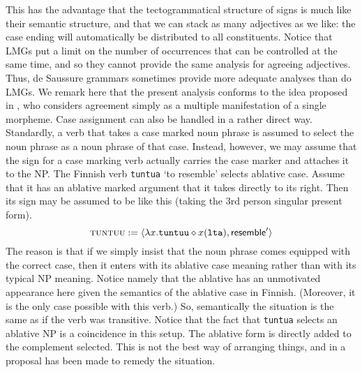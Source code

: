 This has the advantage that the tectogrammatical structure of signs 
is much like their semantic structure, and that we can stack as many 
adjectives as we like: the case ending will automatically be distributed 
to all constituents. Notice that LMGs put a limit on the number of 
occurrences that can be controlled at the same time, and so they 
cannot provide the same analysis for agreeing adjectives. Thus, 
de Saussure grammars sometimes provide more adequate analyses than 
do LMGs. We remark here that the present analysis conforms to the idea 
proposed in \cite{harris:structural}, 
who considers agreement simply
as a multiple manifestation of a single morpheme. Case assignment
can also be handled in a rather direct way. Standardly, a verb that
takes a case marked noun phrase is assumed to select the noun phrase
as a noun phrase of that case. Instead, however, we may assume that
the sign for a case marking verb actually carries the case marker
and attaches it to the NP. The Finnish verb {\tt tuntua} `to
resemble' selects ablative case. Assume that it has an
ablative marked argument that it takes directly to its right.
Then its sign may be assumed to be like this (taking the 3rd person
singular present form).
\begin{equation}
\mbox{\sc tuntuu} :=
    \langle \lambda x.\mbox{\tt tuntuu}\diamond x(\mbox{\tt lta}), 
	\mbox{\sf resemble}'\rangle
\end{equation}
The reason is that if we simply insist that the noun phrase comes 
equipped with the correct case, then it enters with its ablative 
case meaning rather than with its typical NP meaning. Notice namely 
that the ablative has an unmotivated appearance here given the 
semantics of the ablative case in Finnish. (Moreover, it is the 
only case possible with this verb.) So, semantically the situation
is the same as if the verb was transitive. Notice that the fact
that {\tt tuntua} selects an ablative NP is a coincidence in this 
setup. The ablative form is directly added to the complement 
selected. This is not the best way of arranging
things, and in \cite{kracht:against} a proposal has been
made to remedy the situation.

